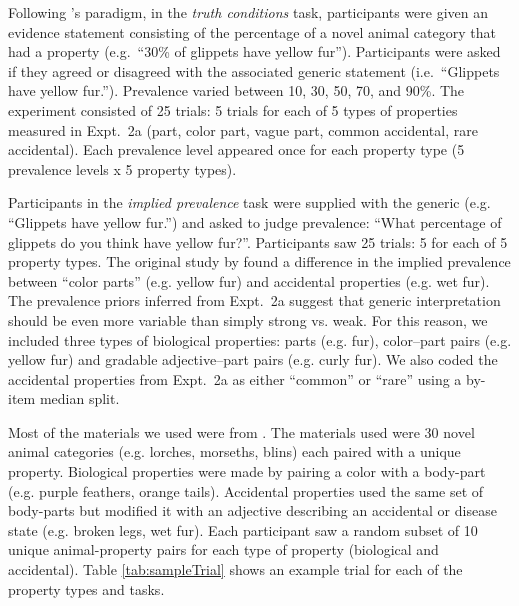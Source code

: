 \documentclass[10pt,letterpaper]{article}
\begin{document}
Following \citeauthor{Cimpian2010}'s paradigm, in the \emph{truth conditions} task, participants were given an evidence statement consisting of the percentage of a novel animal category that had a property (e.g.~``30\% of glippets have yellow fur''). 
Participants were asked if they agreed or disagreed with the associated generic statement (i.e.~``Glippets have yellow fur.'').
Prevalence varied between 10, 30, 50, 70, and 90\%.
The experiment consisted of 25 trials: 5 trials for each of 5 types of properties measured in Expt.~2a (part, color part, vague part, common accidental, rare accidental). 
Each prevalence level appeared once for each property type (5 prevalence levels x 5 property types). 

Participants in the \emph{implied prevalence} task were supplied with the generic (e.g. ``Glippets have yellow fur.'') and asked to judge prevalence: ``What percentage of glippets do you think have yellow fur?''. Participants saw 25 trials: 5 for each of 5 property types.
The original study by \citeauthor{Cimpian2010} found a difference in the implied prevalence between ``color parts'' (e.g. yellow fur) and accidental properties (e.g. wet fur).
The prevalence priors inferred from Expt.~2a suggest that generic interpretation should be even more variable than simply strong vs. weak.
For this reason, we included three types of biological properties: parts (e.g. fur), color--part pairs (e.g. yellow fur) and gradable adjective--part pairs (e.g. curly fur). 
We also coded the accidental properties from Expt.~2a as either ``common'' or ``rare'' using a by-item median split.

 
Most of the materials we used were from \citeauthor{Cimpian2010}. 
The materials used were 30 novel animal categories (e.g. lorches, morseths, blins) each paired with a unique property. 
Biological properties were made by pairing a color with a body-part (e.g. purple feathers, orange tails). 
Accidental properties used the same set of body-parts but modified it with an adjective describing an accidental or disease state (e.g. broken legs, wet fur). 
Each participant saw a random subset of 10 unique animal-property pairs for each type of property (biological and accidental). 
Table \ref{tab:sampleTrial} shows an example trial for each of the property types and tasks.
\end{document}
